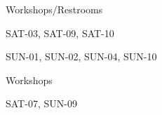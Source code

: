 \documentclass{article}
\newcommand{\room}[1]{
    \noindent
    #1
    \vspace{.2in}

}
\begin{document}
\rssheader[2in]

\vfill

\fontsize{36pt}{40pt}
\selectfont

\begin{minipage}{\textwidth}
    \begin{minipage}{.25\textwidth}
        \begin{center}
            \rssarrowup[1in]
        \end{center}
    \end{minipage}
    \hfill
    \begin{minipage}{.7\textwidth}
        \begin{center}
            \room{Workshops/Restrooms}
\fontsize{18pt}{24pt} \selectfont
            \room{SAT-03, SAT-09, SAT-10}
            \room{SUN-01, SUN-02, SUN-04, SUN-10}
        \end{center}
    \end{minipage}
\end{minipage}

\vfill

\fontsize{36pt}{40pt}
\selectfont

\begin{center}
\room{Workshops}
\fontsize{18pt}{24pt}
\selectfont
\room{SAT-07, SUN-09}
\end{center}

\rssarrowright[1in]

\vfill
\end{document}
